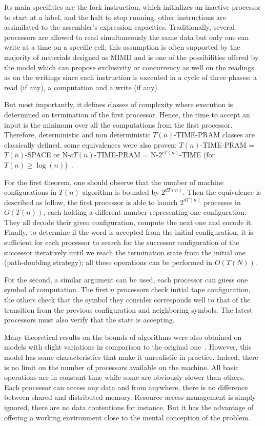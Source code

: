 Its main specifities are the fork instruction, which initializes an inactive processor to start at a label, and the halt to stop running, other instructions are assimilated to the assembler's expression capacities. Traditionally, several processors are allowed to read simultaneously the same data but only one can write at a time on a specific cell; this assumption is often supported by the majority of materials designed as MIMD and is one of the possibilities offered by the model which can propose exclusivity or concurrency as well on the readings as on the writings since each instruction is executed in a cycle of three phases: a read (if any), a computation and a write (if any).

But most importantly, it defines classes of complexity where execution is determined on termination of the first processor. Hence, the time to accept an input is the minimum over all the computations from the first processor. Therefore, deterministic and non deterministic $T(n)$-TIME-PRAM classes are classically defined, some equivalences were also proven: $T(n)$-TIME-PRAM = $T(n)$-SPACE or N-$cT(n)$-TIME-PRAM = N-$2^{cT(n)}$-TIME (for $T(n) \geqslant \log(n)$)~\cite{fortune1978parallelism}.

For the first theorem, one should observe that the number of machine configurations in $T(n)$ algorithm is bounded by $2^{dT(n)}$. Then the equivalence is described as follow, the first processor is able to launch $2^{dT(n)}$ processes in $O(T(n))$, each holding a different number representing one configuration. They all decode their given configuration, compute the next one and encode it. Finally, to determine if the word is accepted from the initial configuration, it is sufficient for each processor to search for the successor configuration of the successor iteratively until we reach the termination state from the initial one (path-doubling strategy); all these operations can be performed in $O(T(N))$.

For the second, a similar argument can be used, each processor can guess one symbol of computation. The first $n$ processors check initial tape configuration, the others check that the symbol they consider corresponds well to that of the transition from the previous configuration and neighboring symbols. The latest processors must also verify that the state is accepting.

Many theoretical results on the bounds of algorithms were also obtained on models with slight variations in comparison to the original one~\cite{karp1988survey}. However, this model has some characteristics that make it unrealistic in practice. Indeed, there is no limit on the number of processors available on the machine. All basic operations are in constant time while some are obviously slower than others. Each processor can access any data and from anywhere, there is no difference between shared and distributed memory. Resource access management is simply ignored, there are no data contentions for instance. But it has the advantage of offering a working environment close to the mental conception of the problem.

